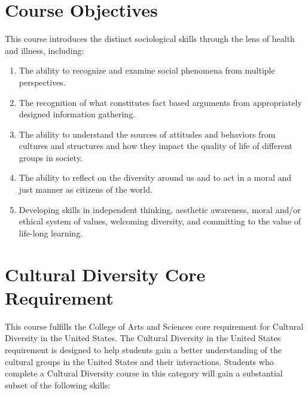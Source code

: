 \documentclass[]{book}
\theoremstyle{definition}
\theoremstyle{definition}
\theoremstyle{definition}
\theoremstyle{remark}
\begin{document}
\hypertarget{course-objectives}{%
\section{Course Objectives}\label{course-objectives}}

This course introduces the distinct sociological skills through the lens
of health and illness, including:

\begin{enumerate}
\def\labelenumi{\arabic{enumi}.}
\item
  The ability to recognize and examine social phenomena from multiple
  perspectives.
\item
  The recognition of what constitutes fact based arguments from
  appropriately designed information gathering.
\item
  The ability to understand the sources of attitudes and behaviors from
  cultures and structures and how they impact the quality of life of
  different groups in society.
\item
  The ability to reflect on the diversity around us and to act in a
  moral and just manner as citizens of the world.
\item
  Developing skills in independent thinking, aesthetic awareness, moral
  and/or ethical system of values, welcoming diversity, and committing
  to the value of life-long learning.
\end{enumerate}

\hypertarget{cultural-diversity-core-requirement}{%
\section{Cultural Diversity Core
Requirement}\label{cultural-diversity-core-requirement}}

This course fulfills the College of Arts and Sciences core requirement
for Cultural Diversity in the United States. The Cultural Diversity in
the United States requirement is designed to help students gain a better
understanding of the cultural groups in the United States and their
interactions. Students who complete a Cultural Diversity course in this
category will gain a substantial subset of the following skills:
\end{document}
